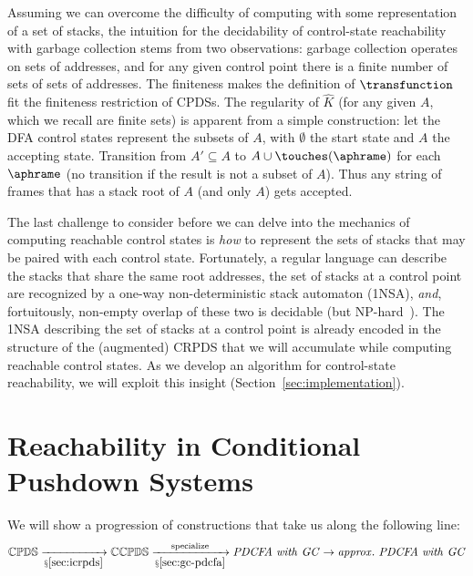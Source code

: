Assuming we can overcome the difficulty of computing with some representation of a set of stacks, the intuition for the decidability of control-state reachability with garbage collection stems from two observations:
garbage collection operates on sets of addresses, and for any given control point there is a finite number of sets of sets of addresses.
The finiteness makes the definition of $\transfunction$ fit the finiteness restriction of CPDSs.
The regularity of $\hat K$ (for any given $A$, which we recall are finite sets) is apparent from a simple construction: let the DFA control states represent the subsets of $A$, with $\emptyset$ the start state and $A$ the accepting state.
Transition from $A' \subseteq A$ to $A \cup \touches(\aphrame)$ for each $\aphrame$ (no transition if the result is not a subset of $A$).
Thus any string of frames that has a stack root of $A$ (and only $A$) gets accepted.

The last challenge to consider before we 
can delve into the mechanics of computing reachable control states
is \emph{how} to represent the sets of stacks 
that may be paired with each control state.
Fortunately, a regular language can describe the stacks that share the same root addresses,
the set of stacks at a control point are recognized by a one-way non-deterministic stack automaton (1NSA), \emph{and}, fortuitously,
non-empty overlap of these two is decidable (but NP-hard~\citep{ianjohnson:rounds:complexity:1973}).
The 1NSA describing the set of stacks at a control point is already encoded in the structure of the (augmented) CRPDS that we will accumulate while computing reachable control states.
As we develop an algorithm for control-state reachability, we will
exploit this insight (Section~\ref{sec:implementation}).


\section{Reachability in Conditional Pushdown Systems}
We will show a progression of constructions that take us along the following line:
\begin{equation*}
  \mathbb{CPDS} \xrightarrow[{\mathsection\ref{sec:icrpds}}]{} \mathbb{CCPDS}
  \xrightarrow[{\mathsection\ref{sec:gc-pdcfa}}]{\text{specialize}} \mathit{PDCFA\ with\ GC} \to \mathit{approx.\ PDCFA\ with\ GC}
\end{equation*}

